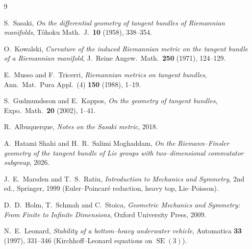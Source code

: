 \documentclass[11pt]{article}
\theoremstyle{definition}
\theoremstyle{plain}
\DeclareMathOperator{\SE}{SE}
\begin{document}
\begin{thebibliography}{9}

S.~Sasaki,
\emph{On the differential geometry of tangent bundles of Riemannian manifolds},
T\^ohoku Math.\ J.\ \textbf{10} (1958), 338--354.

O.~Kowalski,
\emph{Curvature of the induced Riemannian metric on the tangent bundle of a Riemannian manifold},
J.\ Reine Angew.\ Math.\ \textbf{250} (1971), 124--129.

E.~Musso and F.~Tricerri,
\emph{Riemannian metrics on tangent bundles},
Ann.\ Mat.\ Pura Appl.\ (4) \textbf{150} (1988), 1--19.

S.~Gudmundsson and E.~Kappos,
\emph{On the geometry of tangent bundles},
Expo.\ Math.\ \textbf{20} (2002), 1--41.

R.~Albuquerque,
\emph{Notes on the Sasaki metric}, 2018.

A.~Hatami Shahi and H.~R.~Salimi Moghaddam,
\emph{On the Riemann--Finsler geometry of the tangent bundle of Lie groups with
two--dimensional commutator subgroup}, 2026.

J.~E.~Marsden and T.~S.~Ratiu,
\emph{Introduction to Mechanics and Symmetry}, 2nd ed., Springer, 1999
(Euler--Poincar\'e reduction, heavy top, Lie--Poisson).

D.~D.~Holm, T.~Schmah and C.~Stoica,
\emph{Geometric Mechanics and Symmetry: From Finite to Infinite Dimensions},
Oxford University Press, 2009.

N.~E.~Leonard,
\emph{Stability of a bottom--heavy underwater vehicle},
Automatica \textbf{33} (1997), 331--346 (Kirchhoff--Leonard equations on $\SE(3)$).

\end{thebibliography}
\end{document}
